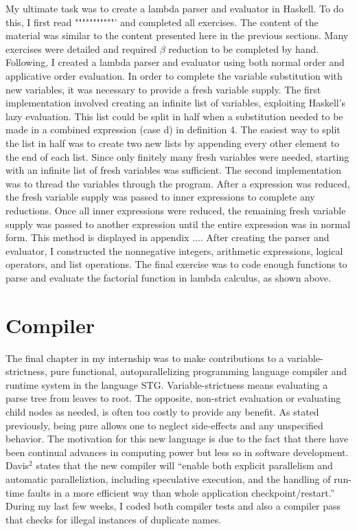 \documentclass[11pt]{article}
\begin{document}
My ultimate task was to create a lambda parser and evaluator in Haskell. To
do this, I first read """""""""""' and completed all exercises.  The
content of the material was similar to the content presented here in the
previous sections. Many exercises were detailed and required $\beta$
reduction to be completed by hand. Following, I created a lambda parser and
evaluator using both normal order and applicative order evaluation. In
order to complete the variable substitution with new variables, it was
necessary to provide a fresh variable supply. The first implementation
involved creating an infinite list of variables, exploiting Haskell's lazy
evaluation. This list could be split in half when a substitution needed to
be made in a combined expression (case d) in definition 4. The easiest way
to split the list in half was to create two new lists by appending every
other element to the end of each list. Since only finitely many fresh
variables were needed, starting with an infinite list of fresh variables
was sufficient. The second implementation was to thread the variables
through the program. After a expression was reduced, the fresh variable
supply was passed to inner expressions to complete any reductions. Once all
inner expressions were reduced, the remaining fresh variable supply was
passed to another expression until the entire expression was in normal
form. This method is displayed in appendix .... After creating the parser
and evaluator, I constructed the nonnegative integers, arithmetic
expressions, logical operators, and list operations. The final exercise was
to code enough functions to parse and evaluate the factorial function in
lambda calculus, as shown above.

\section{Compiler}

The final chapter in my internship was to make contributions to a
variable-strictness, pure functional, autoparallelizing programming language
compiler and runtime system in the language STG. Variable-strictness means
evaluating a parse tree from leaves to root. The opposite, non-strict evaluation or
evaluating child nodes as needed, is often too costly to provide any benefit. As
stated previously, being pure allows one to neglect side-effects and any unspecified behavior. The motivation for this new language is due
to the fact that there have been continual advances in computing power but
less so in software development. Davis$^2$  states that the new compiler will ``enable both explicit
parallelism and automatic paralleliztion, including speculative execution, and
the handling of run-time faults in a more efficient way than whole application
checkpoint/restart.'' During my last few weeks, I coded both compiler tests and also a compiler pass that checks for illegal instances of duplicate names.
\end{document}
